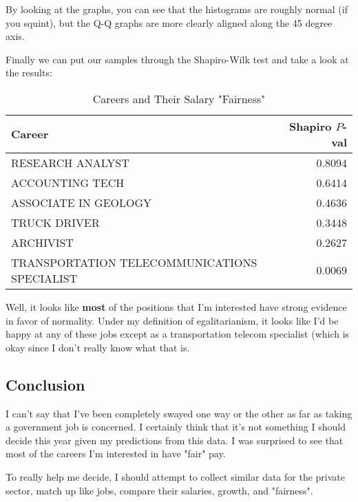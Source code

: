 \documentclass[letterpaper]{article}
\theoremstyle{definition}
\begin{document}
By looking at the graphs, you can see that the histograms are roughly normal (if you
squint), but the Q-Q graphs are more clearly aligned along the 45 degree axis.

Finally we can put our samples through the Shapiro-Wilk test and take a look at the
results:
\begin{table}[htpb]
	\centering
	\caption{Careers and Their Salary "Fairness"}
		\begin{tabular}{lr}
			Career & Shapiro $P$-val\\
		\hline
			 RESEARCH ANALYST                             & 0.8094\\
			 ACCOUNTING TECH                              & 0.6414\\
			 ASSOCIATE IN GEOLOGY                         & 0.4636\\
			 TRUCK DRIVER                                 & 0.3448\\
			 ARCHIVIST                                    & 0.2627\\
			 TRANSPORTATION TELECOMMUNICATIONS SPECIALIST & 0.0069\\
		\end{tabular}
\end{table}



    
    Well, it looks like \textbf{most} of the positions that I'm interested
have strong evidence in favor of normality. Under my definition of
egalitarianism, it looks like I'd be happy at any of these jobs except
as a transportation telecom specialist (which is okay since I don't really know what that
is.

\subsection{Conclusion}

I can't say that I've been completely swayed one way or the other as far as taking a
government job is concerned. I certainly think that it's not something I should decide
this year given my predictions from this data. I was surprised to see that most of the
careers I'm interested in have "fair" pay. 

To really help me decide, I should attempt to collect similar data for the private sector,
match up like jobs, compare their salaries, growth, and "fairness". 

    
\end{document}

